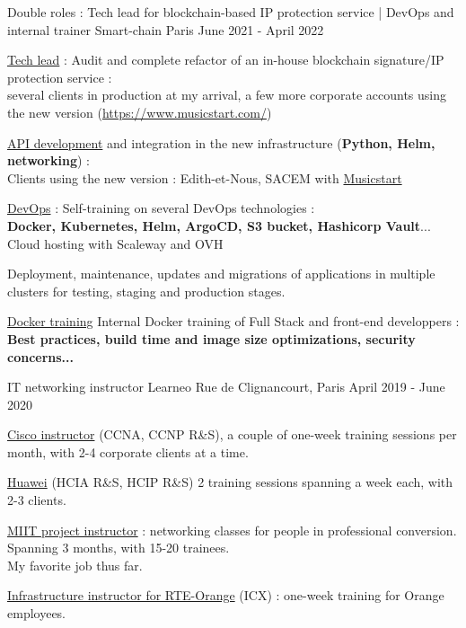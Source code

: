 
\begin{cventries}
  \cventry
    {Double roles : Tech lead for blockchain-based IP protection service | DevOps and internal trainer} %
    {Smart-chain} %
    {Paris} %
    {June 2021 - April 2022} %
    {
      \begin{cvitems} %
      {
        \item {\underline{Tech lead} : Audit and complete refactor of an in-house blockchain signature/IP protection service :\\several clients in production at my arrival, a few more corporate accounts using the new version (\href{https://www.musicstart.com/}{https://www.musicstart.com/})}
        \item {\underline{API development} and integration in the new infrastructure (\textbf{Python, Helm, networking}) :\\Clients using the new version : Edith-et-Nous, SACEM with \href{https://www.musicstart.com/}{Musicstart}}
        \item {\underline{DevOps} : Self-training on several DevOps technologies :\\\textbf{Docker, Kubernetes, Helm, ArgoCD, S3 bucket, Hashicorp Vault}... Cloud hosting with Scaleway and OVH}
        \item {Deployment, maintenance, updates and migrations of applications in multiple clusters for testing, staging and production stages.}
        \item {\underline{Docker training} Internal Docker training of Full Stack and front-end developpers : \textbf{Best practices, build time and image size optimizations, security concerns...}}
      }
      \end{cvitems}
    }

  \cventry
    {IT networking instructor} %
    {Learneo} %
    {Rue de Clignancourt, Paris} %
    {April 2019 - June 2020} %
    {
      \begin{cvitems} %
      {
        \item {\underline{Cisco instructor} (CCNA, CCNP R\&S), a couple of one-week training sessions per month, with 2-4 corporate clients at a time.}
        \item {\underline{Huawei} (HCIA R\&S, HCIP R\&S) 2 training sessions spanning a week each, with 2-3 clients.}
        \item {\underline{MIIT project instructor} : networking classes for people in professional conversion. Spanning 3 months, with 15-20 trainees.\\My favorite job thus far.}
        \item {\underline{Infrastructure instructor for RTE-Orange} (ICX) : one-week training for Orange employees.}
      }
      \end{cvitems}
    }


\end{cventries}
